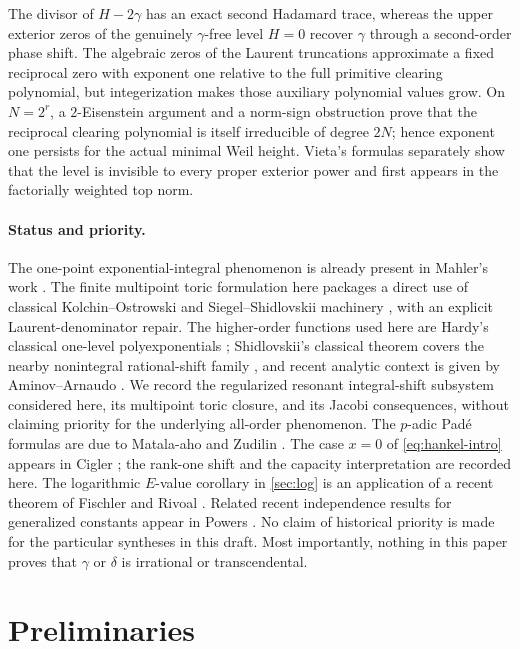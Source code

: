 \documentclass[11pt]{article}
\theoremstyle{definition}
\theoremstyle{remark}
\begin{document}
The divisor of \(H-2\gamma\) has an exact second Hadamard trace, whereas the
upper exterior zeros of the genuinely \(\gamma\)-free level \(H=0\) recover
\(\gamma\) through a second-order phase shift.  The algebraic zeros of the
Laurent truncations approximate a fixed reciprocal zero with exponent one
relative to the full primitive clearing polynomial, but integerization makes
those auxiliary polynomial values grow.  On \(N=2^r\), a \(2\)-Eisenstein
argument and a norm-sign obstruction prove that the reciprocal clearing
polynomial is itself irreducible of degree \(2N\); hence exponent one persists
for the actual minimal Weil height.  Vieta's formulas separately show that
the level is invisible to every proper exterior power and first appears in
the factorially weighted top norm.

\paragraph{Status and priority.}
The one-point exponential-integral phenomenon is already present in
Mahler's work \cite{Mahler1968}.  The finite multipoint toric formulation
here packages a direct use of classical Kolchin--Ostrowski and
Siegel--Shidlovskii machinery \cite{Kolchin,Beukers2006}, with an explicit
Laurent-denominator repair.  The higher-order functions used here are
Hardy's classical one-level polyexponentials
\cite{Hardy1905PartII,Boyadzhiev2007}; Shidlovskii's classical theorem
covers the nearby nonintegral rational-shift family
\cite[Chap.~7, Sec.~3]{Shidlovskii1989}, and recent analytic context is
given by Aminov--Arnaudo \cite{AminovArnaudo2026}.  We record the regularized
resonant integral-shift subsystem considered here, its multipoint toric closure,
and its Jacobi consequences, without claiming priority for the underlying
all-order phenomenon.  The \(p\)-adic Pad\'e formulas are due to
Matala-aho and Zudilin \cite{MZ2018}.  The case \(x=0\) of
\eqref{eq:hankel-intro} appears in Cigler \cite{Cigler2017}; the rank-one shift and the capacity
interpretation are recorded here.  The logarithmic \(E\)-value corollary in
\cref{sec:log} is an application of a recent theorem of Fischler and Rivoal
\cite{FRlog}.  Related recent independence results for generalized constants
appear in Powers \cite{Powers2025}.
No claim of historical priority is made for the particular syntheses in this
draft.  Most importantly, nothing in this paper proves that \(\gamma\) or
\(\delta\) is irrational or transcendental.

\section{Preliminaries}
\end{document}
